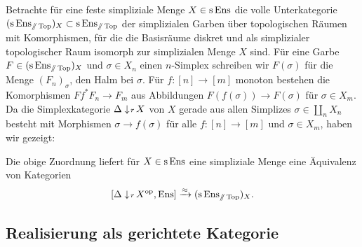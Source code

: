 Betrachte für eine feste simpliziale Menge $X \in \operatorname{s}\operatorname{Ens}$ die volle
Unterkategorie $(\operatorname{s}\operatorname{Ens}_{\mathbin{/\mkern-6mu/} \operatorname{Top}})_X \subset \operatorname{s}\operatorname{Ens}_{\mathbin{/\mkern-6mu/} \operatorname{Top}}$ der simplizialen
Garben über topologischen Räumen mit Komorphismen, für die die
Basisräume diskret und als simplizialer topologischer Raum isomorph
zur simplizialen Menge $X$ sind. Für eine Garbe $F \in
(\operatorname{s}\operatorname{Ens}_{\mathbin{/\mkern-6mu/} \operatorname{Top}})_X$ und $\sigma \in X_n$ einen $n$-Simplex schreiben wir
$F(\sigma)$ für die Menge $(F_n)_\sigma$, den Halm bei $\sigma$. Für
$f: [n] \to [m]$ monoton bestehen die Komorphismen $Ff^* F_n \to F_m$
aus Abbildungen $F(f(\sigma)) \to F(\sigma)$ für $\sigma \in X_m$. Da
die Simplexkategorie $\Delta \downarrow \! {\scriptstyle r} \, X$ von $X$ gerade aus
allen Simplizes $\sigma \in \coprod_n X_n$ besteht mit Morphismen
$\sigma \to f(\sigma)$ für alle $f: [n] \to [m]$ und $\sigma \in X_m$,
haben wir gezeigt:
\begin{prop} \label{real-simplex-cat}
  Die obige Zuordnung liefert für $X \in \operatorname{s}\operatorname{Ens}$ eine simpliziale
  Menge eine Äquivalenz von Kategorien
  \[ [\Delta \downarrow \! {\scriptstyle r} \, X^\mathrm{op}, \operatorname{Ens}] \xrightarrow{\approx} (\operatorname{s}\operatorname{Ens}_{\mathbin{/\mkern-6mu/} \operatorname{Top}})_X. \]
\end{prop}

\subsection{Realisierung als gerichtete Kategorie}
\label{sec:real-directed-cat}

